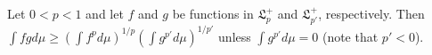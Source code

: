 Let $0 < p < 1$ and let $f$ and $g$ be functions in $\mathfrak{L}_p^+$ and $\mathfrak{L}_{p'}^+$, respectively. Then $\int f g d\mu \geq \left( \int f^p d\mu \right)^{1/p} \left( \int g^{p'} d\mu \right)^{1/p'}$ unless $\int g^{p'} d\mu = 0$ (note that $p' < 0$).
